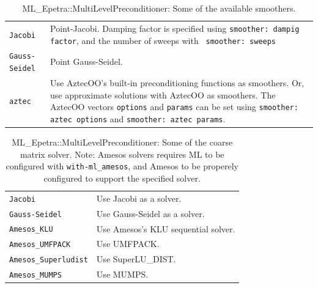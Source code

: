 \begin{table}
\begin{center}
\begin{tabular}{ | p{5cm} | p{10cm} | }
\hline
\verb!Jacobi! & Point-Jacobi. Damping factor is specified using
{\tt smoother: dampig factor}, and the number of sweeps with {\tt
  smoother: sweeps} \\ 
\verb!Gauss-Seidel! & Point Gauss-Seidel. \\
\verb!aztec! & Use AztecOO's built-in preconditioning functions as
smoothers. Or, use approximate solutions with AztecOO as smoothers. 
The AztecOO vectors \verb!options! and {\tt params} can be set using
{\tt smoother: aztec options} and {\tt smoother: aztec params}. \\
\hline
\end{tabular}
\caption{ML\_Epetra::MultiLevelPreconditioner: Some of the available
  smoothers.} 
\label{tab:ml:smoother}
\end{center}
\end{table}

\begin{table}
\begin{center}
\begin{tabular}{ | p{5cm} | p{10cm} | }
\hline
\verb!Jacobi! & Use Jacobi as a solver. \\
\verb!Gauss-Seidel! & Use Gauss-Seidel as a solver. \\
\verb!Amesos_KLU! & Use Amesos's KLU sequential solver. \\
\verb!Amesos_UMFPACK! & Use UMFPACK. \\
\verb!Amesos_Superludist! & Use SuperLU\_DIST. \\
\verb!Amesos_MUMPS! & Use MUMPS. \\
\hline
\end{tabular}
\caption{ML\_Epetra::MultiLevelPreconditioner: Some of the coarse matrix
  solver. Note: Amesos solvers requires 
  ML to be configured with {\tt with-ml\_amesos}, and Amesos to be
  properely configured to support the specified solver.}
\label{tab:ml:coarse}
\end{center}
\end{table}

